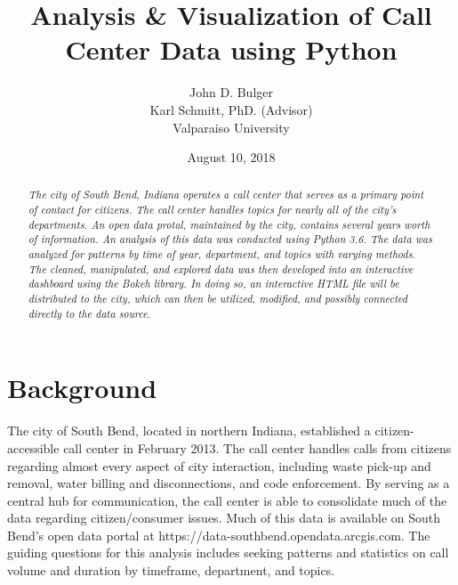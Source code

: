 \documentclass[11pt,twocolumn]{article}
\title{Analysis \& Visualization of Call Center Data using Python}
\author{John D. Bulger
\\
Karl Schmitt, PhD. (Advisor)
\\
Valparaiso University\\
}
\date{August 10, 2018}
\begin{document}
\maketitle

\begin{abstract}
\textit{The city of South Bend, Indiana operates a call center that serves as a primary point of contact for citizens.  The call center handles topics for nearly all of the city's departments.  An open data protal, maintained by the city, contains several years worth of information.  An analysis of this data was conducted using Python 3.6.  The data was 
analyzed for patterns by time of year, department, and topics with varying methods.  The cleaned, manipulated, and explored data was then developed into an 
interactive dashboard using the Bokeh library.  In doing so, an interactive HTML file will be distributed to the city, which can then be utilized, modified, and possibly connected 
directly to the data source}.
\end{abstract}

\section{Background}
The city of South Bend, located in northern Indiana, established a citizen-accessible call center in February 2013.  The call center handles calls from citizens regarding almost every aspect of city interaction, including waste pick-up and removal, water billing and disconnections, 
and code enforcement.  By serving as a central hub for communication, the call center is able to consolidate much of the data regarding citizen/consumer issues.  
Much of this data is available on South Bend's open data portal at https://data-southbend.opendata.arcgis.com.  The guiding questions for this analysis includes seeking patterns and statistics on call volume and duration by timeframe, department, and topics.
\end{document}
